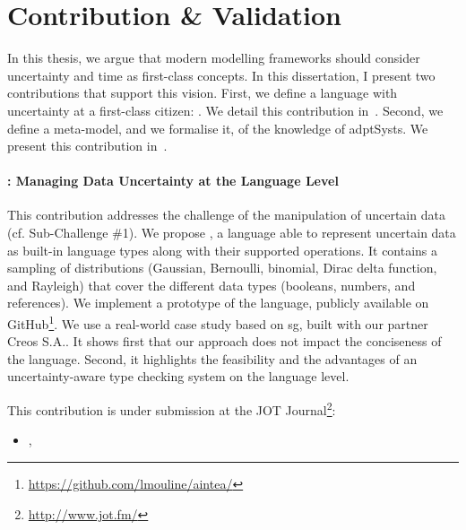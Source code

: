 \section{Contribution \& Validation}

In this thesis, we argue that modern modelling frameworks should consider uncertainty and time as first-class concepts.
In this dissertation, I present two contributions that support this vision.
First, we define a language with uncertainty at a first-class citizen: \langName.
We detail this contribution in~.
Second, we define a meta-model, and we formalise it, of the knowledge of \glspl{adptSyst}.
We present this contribution in~.

\paragraph{\langName{}: Managing Data Uncertainty at the Language Level}
This contribution addresses the challenge of the manipulation of uncertain data (cf. Sub-Challenge \#1). %
 We propose \langName{}, a language able to represent uncertain data as built-in language types along with their supported operations. 
 It contains a sampling of distributions (Gaussian, Bernoulli, binomial, Dirac delta function, and Rayleigh) that cover the different data types (booleans, numbers, and references).
 We implement a prototype of the language, publicly available on GitHub\footnote{\url{https://github.com/lmouline/aintea/}}.
 We use a real-world case study based on \gls{sg}, built with our partner Creos S.A..
It shows first that our approach does not impact the conciseness of the language.
Second, it highlights the feasibility and the advantages of an uncertainty-aware type checking system on the language level.

This contribution is under submission at the JOT Journal\footnote{\url{http://www.jot.fm/}}:
\begin{itemize}
	\item {}, \citeauthor{insubmission:2019:comlan:datauncertainty}
\end{itemize}

